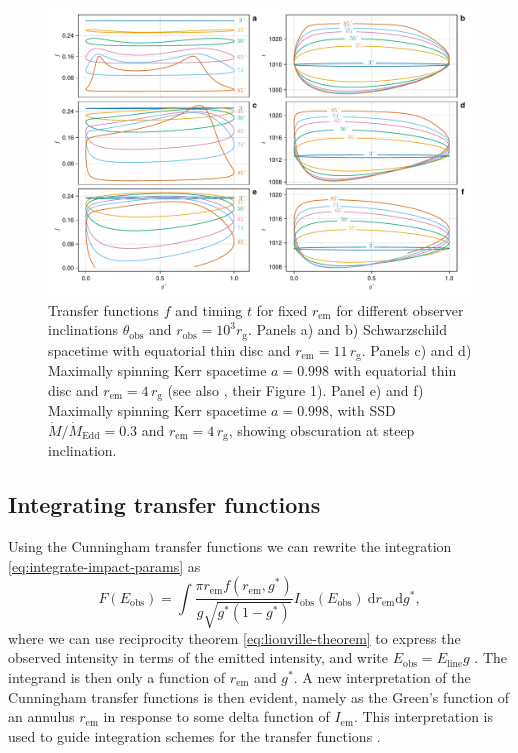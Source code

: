 \documentclass[fleqn,usenatbib]{mnras}
\renewcommand{\d}{\text{d}}
\newcommand{\rg}{r_\text{g}}
\newcommand{\rhoem}{r_\text{em}}
\begin{document}
\begin{figure}
    \centering
    \includegraphics[width=0.99\linewidth]{figures/transfer-functions.plots.pdf}
    \caption{Transfer functions $f$ and timing $t$ for fixed $\rhoem$ for different observer inclinations $\theta_\text{obs}$ and $r_\text{obs} = 10^3 \rg$. Panels a) and b) Schwarzschild spacetime with equatorial thin disc and $\rhoem = 11\, \rg$. Panels c) and d) Maximally spinning Kerr spacetime $a=0.998$ with equatorial thin disc and $\rhoem = 4 \, \rg$ (see also \citealp{bambi_testing_2017}, their Figure 1). Panel e) and f) Maximally spinning Kerr spacetime $a=0.998$, with SSD $\dot{M} / \dot{M}_\text{Edd} = 0.3$ and $\rhoem = 4\, \rg$, showing obscuration at steep inclination.}
    \label{fig:transfer-functions}
\end{figure}

\subsection{Integrating transfer functions}
\label{sec:transfer-function-integration}

Using the Cunningham transfer functions we can rewrite the integration
\eqref{eq:integrate-impact-params} as
\begin{equation}
    F(E_\text{obs}) = \int \frac{\pi \rhoem f(\rhoem, g^\ast)}{g \sqrt{g^\ast (1 - g^\ast)}}
    I_\text{obs}(E_\text{obs}) \ \d \rhoem \d g^\ast,
\end{equation}
where we can use reciprocity theorem \eqref{eq:liouville-theorem} to express the
observed intensity in terms of the emitted intensity, and write $E_\text{obs} =
E_\text{line}g$ . The integrand is then only a function of $\rhoem$ and
$g^\ast$. A new interpretation of the Cunningham transfer functions is then
evident, namely as the Green's function of an annulus $\rhoem$ in response to
some delta function of $I_\text{em}$. This interpretation is used to guide
integration schemes for the transfer functions \citep{dauser_broad_2010}.
\end{document}
